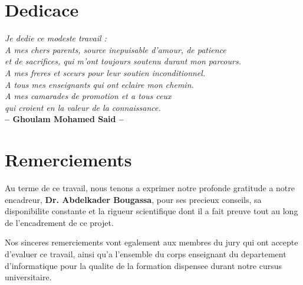 \documentclass[12pt,a4paper]{report}
\begin{document}
\chapter*{Dedicace}

\vspace*{2cm}
\begin{center}
\begin{minipage}{0.85\textwidth}
\begin{center}
\textit{Je dedie ce modeste travail :}\\[0.5cm]

\textit{A mes chers parents, source inepuisable d'amour, de patience}\\
\textit{et de sacrifices, qui m'ont toujours soutenu durant mon parcours.}\\[0.5cm]

\textit{A mes freres et sceurs pour leur soutien inconditionnel.}\\[0.5cm]

\textit{A tous mes enseignants qui ont eclaire mon chemin.}\\[0.5cm]

\textit{A mes camarades de promotion et a tous ceux}\\
\textit{qui croient en la valeur de la connaissance.}\\[1cm]

\textbf{-- Ghoulam Mohamed Said --}
\end{center}
\end{minipage}
\end{center}

\chapter*{Remerciements}

Au terme de ce travail, nous tenons a exprimer notre profonde gratitude
a notre encadreur, \textbf{Dr. Abdelkader Bougassa}, pour ses precieux
conseils, sa disponibilite constante et la rigueur scientifique dont il
a fait preuve tout au long de l'encadrement de ce projet.

Nos sinceres remerciements vont egalement aux membres du jury qui ont
accepte d'evaluer ce travail, ainsi qu'a l'ensemble du corps enseignant
du departement d'informatique pour la qualite de la formation dispensee
durant notre cursus universitaire.
\end{document}
